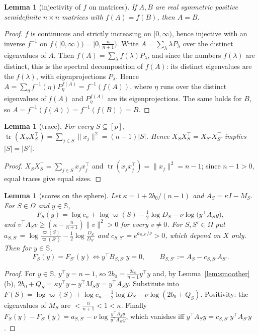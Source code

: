 \documentclass[11pt]{article}
\newtheorem{lemma}[theorem]{Lemma}
\theoremstyle{remark}
\newcommand{\Sph}{\mathbb S}
\DeclareMathOperator{\tr}{tr}
\begin{document}
\begin{lemma}[injectivity of $f$ on matrices]\label{lem:inj}
If $A,B$ are real symmetric positive semidefinite $n\times n$ matrices with $f(A)=f(B)$, then $A=B$.
\end{lemma}
\begin{proof}
$f$ is continuous and strictly increasing on $[0,\infty)$, hence injective with an inverse $f^{-1}$ on $f([0,\infty))=[0,\tfrac n{n+1})$. Write $A=\sum_\lambda\lambda P_\lambda$ over the distinct eigenvalues of $A$. Then $f(A)=\sum_\lambda f(\lambda)P_\lambda$, and since the numbers $f(\lambda)$ are distinct, this is the spectral decomposition of $f(A)$: its distinct eigenvalues are the $f(\lambda)$, with eigenprojections $P_\lambda$. Hence $A=\sum_{\eta}f^{-1}(\eta)P^{f(A)}_\eta=f^{-1}(f(A))$, where $\eta$ runs over the distinct eigenvalues of $f(A)$ and $P^{f(A)}_\eta$ are its eigenprojections. The same holds for $B$, so $A=f^{-1}(f(A))=f^{-1}(f(B))=B$.
\end{proof}

\begin{lemma}[trace]\label{lem:trace}
For every $S\subseteq[p]$, $\tr(X_SX_S^\top)=\sum_{j\in S}\|x_j\|^2=(n-1)|S|$. Hence $X_SX_S^\top=X_{S'}X_{S'}^\top$ implies $|S|=|S'|$.
\end{lemma}
\begin{proof}
$X_SX_S^\top=\sum_{j\in S}x_jx_j^\top$ and $\tr(x_jx_j^\top)=\|x_j\|^2=n-1$; since $n-1>0$, equal traces give equal sizes.
\end{proof}

\begin{lemma}[scores on the sphere]\label{lem:sphere}
Let $\kappa=1+2b_0/(n-1)$ and $A_S=\kappa I-M_S$. For $S\in\Omega$ and $y\in\Sph$,
\[
F_S(y)=\log c_n+\log\varpi(S)-\tfrac12\log D_S-\nu\log\big(y^\top A_Sy\big),
\]
and $v^\top A_Sv\ge(\kappa-\tfrac n{n+1})\|v\|^2>0$ for every $v\ne0$. For $S,S'\in\Omega$ put $a_{S,S'}=\log\frac{\varpi(S)}{\varpi(S')}-\frac12\log\frac{D_S}{D_{S'}}$ and $c_{S,S'}=e^{a_{S,S'}/\nu}>0$, which depend on $X$ only. Then for $y\in\Sph$,
\begin{equation}\label{eq:tieform}
F_S(y)=F_{S'}(y)\iff y^\top B_{S,S'}\,y=0,\qquad B_{S,S'}:=A_S-c_{S,S'}A_{S'} .
\end{equation}
\end{lemma}
\begin{proof}
For $y\in\Sph$, $y^\top y=n-1$, so $2b_0=\tfrac{2b_0}{n-1}y^\top y$ and, by Lemma~\ref{lem:smoother}(b), $2b_0+Q_S=\kappa y^\top y-y^\top M_Sy=y^\top A_Sy$. Substitute into $F(S)=\log\varpi(S)+\log c_n-\frac12\log D_S-\nu\log(2b_0+Q_S)$. Positivity: the eigenvalues of $M_S$ are $<\frac n{n+1}<1<\kappa$. Finally $F_S(y)-F_{S'}(y)=a_{S,S'}-\nu\log\frac{y^\top A_Sy}{y^\top A_{S'}y}$, which vanishes iff $y^\top A_Sy=c_{S,S'}\,y^\top A_{S'}y$.
\end{proof}
\end{document}
